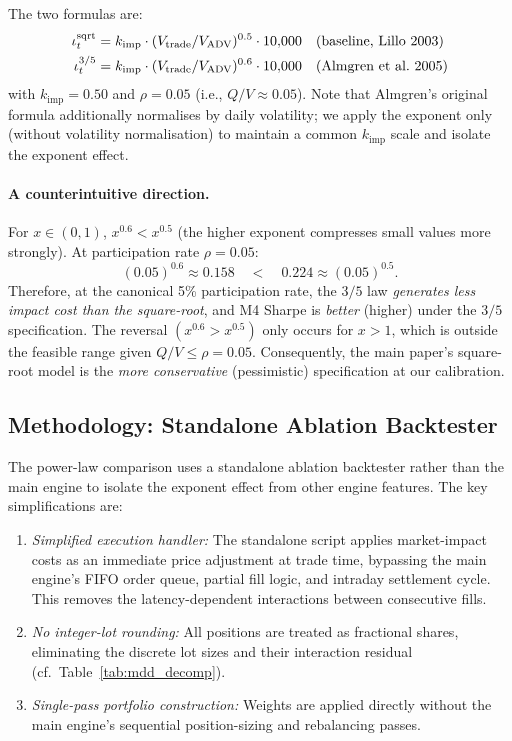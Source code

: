\documentclass[12pt]{article}
\newcommand{\kimp}{k_{\mathrm{imp}}}
\begin{document}
The two formulas are:
\begin{align}
  \iota_t^{\rm sqrt}     &= \kimp \cdot (V_{\rm trade}/V_{\rm ADV})^{0.5} \cdot 10{,}000
  \quad \text{(baseline, Lillo 2003)} \\
  \iota_t^{3/5}          &= \kimp \cdot (V_{\rm trade}/V_{\rm ADV})^{0.6} \cdot 10{,}000
  \quad \text{(Almgren et al.\ 2005)}
\end{align}
with $\kimp = 0.50$ and $\rho = 0.05$ (i.e., $Q/V \approx 0.05$).
Note that Almgren's original formula additionally normalises by daily
volatility; we apply the exponent only (without volatility normalisation)
to maintain a common $\kimp$ scale and isolate the exponent effect.

\paragraph{A counterintuitive direction.}
For $x \in (0, 1)$, $x^{0.6} < x^{0.5}$ (the higher exponent compresses
small values more strongly). At participation rate $\rho = 0.05$:
\[
  (0.05)^{0.6} \approx 0.158 \quad < \quad 0.224 \approx (0.05)^{0.5}.
\]
Therefore, at the canonical 5\% participation rate, the $3/5$ law
\emph{generates less impact cost than the square-root}, and M4 Sharpe
is \emph{better} (higher) under the $3/5$ specification.
The reversal $(x^{0.6} > x^{0.5})$ only occurs for $x > 1$, which
is outside the feasible range given $Q/V \le \rho = 0.05$.
Consequently, the main paper's square-root model is the
\emph{more conservative} (pessimistic) specification at our
calibration.

\subsection{Methodology: Standalone Ablation Backtester}
\label{app:power_law_method}

The power-law comparison uses a standalone ablation backtester rather
than the main engine to isolate the exponent effect from other engine
features. The key simplifications are:

\begin{enumerate}[leftmargin=*,itemsep=2pt]
  \item \textit{Simplified execution handler:} The standalone script
    applies market-impact costs as an immediate price adjustment at
    trade time, bypassing the main engine's FIFO order queue, partial
    fill logic, and intraday settlement cycle. This removes the
    latency-dependent interactions between consecutive fills.
  \item \textit{No integer-lot rounding:} All positions are treated
    as fractional shares, eliminating the discrete lot sizes and their
    interaction residual (cf.\ Table~\ref{tab:mdd_decomp}).
  \item \textit{Single-pass portfolio construction:} Weights are
    applied directly without the main engine's sequential
    position-sizing and rebalancing passes.
\end{enumerate}
\end{document}
